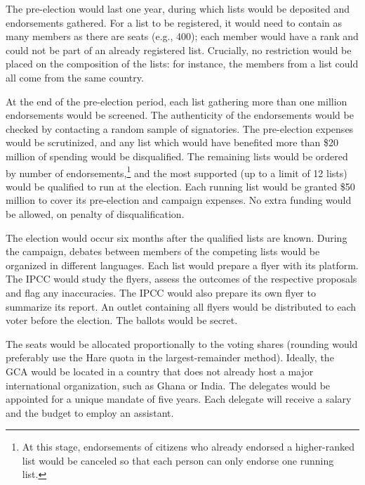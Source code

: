 \documentclass[12pt,english]{article}
\begin{document}
The pre-election would last one year, during which lists would be deposited and endorsements gathered. For a list to be registered, it would need to contain as many members as there are seats (e.g., 400); each member would have a rank and could not be part of an already registered list. Crucially, no restriction would be placed on the composition of the lists: for instance, the members from a list could all come from the same country. %

At the end of the pre-election period, each list gathering more than one million endorsements would be screened. The authenticity of the endorsements would be checked by contacting a random sample of signatories. The pre-election expenses would be scrutinized, and any list which would have benefited more than \$20 million of spending would be disqualified. The remaining lists would be ordered by number of endorsements,\footnote{At this stage, endorsements of citizens who already endorsed a higher-ranked list would be canceled so that each person can only endorse one running list.
} and the most supported (up to a limit of 12 lists) would be qualified to run at the election. Each running list would be granted \$50 million to cover its pre-election and campaign expenses. No extra funding would be allowed, on penalty of disqualification.

The election would occur six months after the qualified lists are known. During the campaign, debates between members of the competing lists would be organized in different languages. Each list would prepare a flyer with its platform. The IPCC would study the flyers, assess the outcomes of the respective proposals and flag any inaccuracies. The IPCC would also prepare its own flyer to summarize its report. An outlet containing all flyers would be distributed to each voter before the election. The ballots would be secret. 

The seats would be allocated proportionally to the voting shares (rounding would preferably use the Hare quota in the largest-remainder method). Ideally, the GCA would be located in a country that does not already host a major international organization, such as Ghana or India. The delegates would be appointed for a unique mandate of five years. Each delegate will receive a salary and the budget to employ an assistant. 
\end{document}
